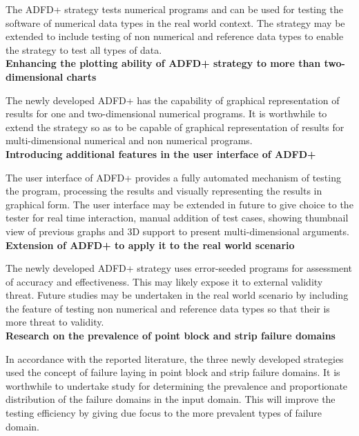 The ADFD+ strategy tests numerical programs and can be used for testing the software of numerical data types in the real world context. The strategy may be extended to include testing of  
non numerical and reference data types to enable the strategy to test all types of data. \\






\textbf{Enhancing the plotting ability of ADFD+ strategy to more than two-dimensional charts}

The newly developed ADFD+ has the capability of graphical representation of results for one and two-dimensional numerical programs. It is worthwhile to extend the strategy so as to be capable of graphical representation of results for multi-dimensional numerical and non numerical programs. \\

\textbf{Introducing additional features in the user interface of ADFD+}

The user interface of ADFD+ provides a fully automated mechanism of testing the program, processing the results and visually representing the results in graphical form. The user interface may be extended in future to give choice to the tester for real time interaction, manual addition of test cases, showing thumbnail view of previous graphs and 3D support to present multi-dimensional arguments.\\

\textbf{Extension of ADFD+ to apply it to the real world scenario}

The newly developed ADFD+ strategy uses error-seeded programs for assessment of accuracy and effectiveness. This may likely expose it to external validity threat.  Future studies may be undertaken in the real world scenario by including the feature of testing non numerical and reference data types so that their is more threat to validity.  \\

\textbf{Research on the prevalence of point block and strip failure domains}

In accordance with the reported literature, the three newly developed strategies used the concept of failure laying in point block and strip failure domains. It is worthwhile to undertake study for determining the prevalence and proportionate distribution of the failure domains in the input domain. This will improve the testing efficiency by giving due focus to the more prevalent types of failure domain.  \\


